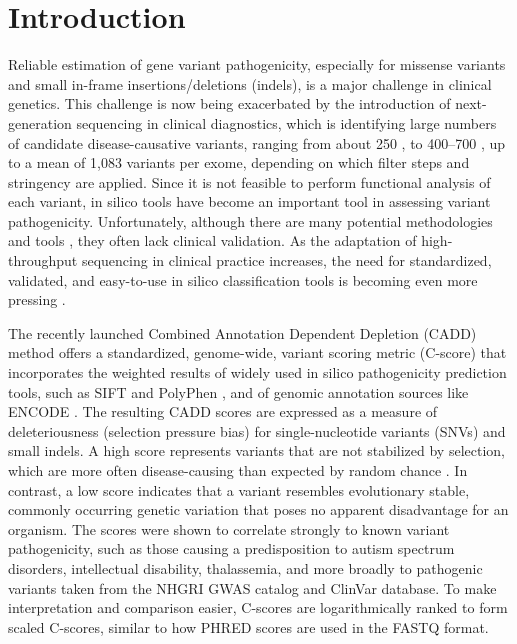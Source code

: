 \section{Introduction}

Reliable estimation of gene variant pathogenicity, especially for missense variants and small in-frame insertions/deletions (indels), is a major challenge in clinical genetics.
This challenge is now being exacerbated by the introduction of next-generation sequencing in clinical diagnostics, which is identifying large numbers of candidate disease-causative variants, ranging from about 250 \cite{Lohmann_2014}, to 400–700 \cite{Yang_2013}, up to a mean of 1,083 \cite{Saunders_2012} variants per exome, depending on which filter steps and stringency are applied.
Since it is not feasible to perform functional analysis of each variant, in silico tools have become an important tool in assessing variant pathogenicity.
Unfortunately, although there are many potential methodologies and tools \cite{Cooper_2011}, they often lack clinical validation.
As the adaptation of high-throughput sequencing in clinical practice increases, the need for standardized, validated, and easy-to-use in silico classification tools is becoming even more pressing \cite{Saunders_2012,Yang_2013}.

The recently launched Combined Annotation Dependent Depletion (CADD) \cite{Kircher_2014} method offers a standardized, genome-wide, variant scoring metric (C-score) that incorporates the weighted results of widely used in silico pathogenicity prediction tools, such as SIFT \cite{Kumar_2009} and PolyPhen \cite{Adzhubei_2010}, and of genomic annotation sources like ENCODE \cite{Dunham_2012}.
The resulting CADD scores are expressed as a measure of deleteriousness (selection pressure bias) for single-nucleotide variants (SNVs) and small indels.
A high score represents variants that are not stabilized by selection, which are more often disease-causing than expected by random chance \cite{Kircher_2014}. In contrast, a low score indicates that a variant resembles evolutionary stable, commonly occurring genetic variation that poses no apparent disadvantage for an organism.
The scores were shown to correlate strongly to known variant pathogenicity, such as those causing a predisposition to autism spectrum disorders, intellectual disability, thalassemia, and more broadly to pathogenic variants taken from the NHGRI GWAS catalog \cite{Welter_2013} and ClinVar \cite{Landrum_2013} database.
To make interpretation and comparison easier, C-scores are logarithmically ranked to form scaled C-scores, similar to how PHRED scores are used in the FASTQ format.

